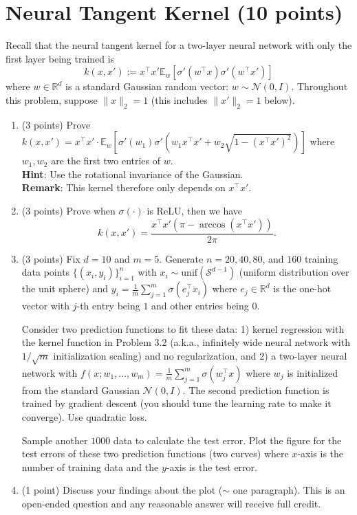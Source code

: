 \documentclass[11pt]{article}
\newcommand{\unif}{\mathrm{unif}}
\begin{document}
\section{Neural Tangent Kernel (10 points)}
Recall that the neural tangent kernel for a two-layer neural network with only the first layer being trained is \[
k(x,x') := x^\top x' \mathbb{E}_{w }\left[\sigma'(w^\top x)\sigma'(w^\top x')\right]
\]
where $w \in \mathbb{R}^d$ is a standard Gaussian random vector: $w \sim \mathcal{N}(0,I)$.
Throughout this problem, suppose $\|x\|_2=1$ (this includes $\|x'\|_2=1$ below).
\begin{enumerate}
    \item (3 points) Prove $k(x,x')= x^\top x' \cdot \mathbb{E}_w\left[\sigma'(w_1) \sigma'\left(w_1 x^\top x' + w_2\sqrt{1-(x^\top x')^2}\right)\right]$ where $w_1,w_2$ are the first two entries of $w$.\\
    \textbf{Hint}: Use the rotational invariance of the Gaussian.\\
    \textbf{Remark}: This kernel therefore only depends on $x^\top x'$.
    \item (3 points) Prove when $\sigma(\cdot)$ is ReLU, then we have \[
    k(x,x') = \frac{x^\top x' \left(\pi - \arccos\left(x^\top x'\right)\right)}{2\pi}.
    \]
    \item (3 points) Fix $d=10$ and $m=5$. Generate $n = 20, 40, 80$, and $160$ training data points $\{(x_i,y_i)\}_{i=1}^n$ with $x_i \sim \unif\left(\mathcal{S}^{d-1}\right)$ (uniform distribution over the unit sphere) and $y_i = \frac{1}{m}\sum_{j=1}^m \sigma(e_j^\top x_i) $ where $e_j \in \mathbb{R}^d$ is the one-hot vector with $j$-th entry being $1$ and other entries being $0$. 
    
    Consider two prediction functions to fit these data: 1) kernel regression with the kernel function in Problem 3.2 (a.k.a., infinitely wide neural network with $1/\sqrt{m}$ initialization scaling) and no regularization, and 2) a two-layer neural network with $f(x;w_1,\ldots,w_m) = \frac{1}{m}\sum_{j=1}^m \sigma(w_j^\top x) $ where $w_j$ is initialized from the standard Gaussian $\mathcal{N}(0,I)$. The second prediction function is trained by gradient descent (you should tune the learning rate to make it converge). 
    Use quadratic loss.
    
    Sample another $1000$ data to calculate the test error.
    Plot the figure for the test errors of these two prediction functions (two curves) where $x$-axis is the number of training data and the $y$-axis is the test error.
    \item (1 point) Discuss your findings about the plot ($\sim$ one paragraph). This is an open-ended question and any reasonable answer will receive full credit.
\end{enumerate}
\end{document}
